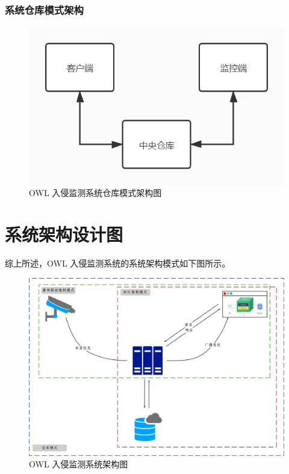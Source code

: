 \documentclass[article]{BJTU-thesis}
\begin{document}
\subsubsection{系统仓库模式架构}
\begin{figure}[!htbp]
	\centering
	\includegraphics[scale=.8]{img/t13.png}
	\caption{OWL 入侵监测系统仓库模式架构图}
\end{figure}
\newpage
\section{系统架构设计图}
综上所述，OWL 入侵监测系统的系统架构模式如下图所示。

\begin{figure}[!htbp]
	\centering
	\includegraphics[scale=.28]{img/t14.png}
	\caption{OWL 入侵监测系统架构图}
\end{figure}
\end{document}
